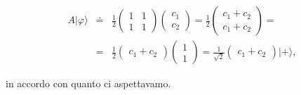 \begin{eqnarray}
A | \varphi \rangle &\doteq & \frac{1}{2}
\begin{pmatrix}
1 & 1\\
1 & 1
\end{pmatrix}
\begin{pmatrix}
c_1\\
c_2
\end{pmatrix}=
\frac{1}{2}
\begin{pmatrix}
c_1+c_2\\
c_1+c_2
\end{pmatrix}=\nonumber \\
&=& \frac{1}{2}
\begin{pmatrix}
c_1 + c_2
\end{pmatrix}
\begin{pmatrix}
1\\
1
\end{pmatrix}=
\frac{1}{\sqrt{2}}
\begin{pmatrix}
c_1 + c_2
\end{pmatrix}
| + \rangle ,
\end{eqnarray}

in accordo con quanto ci aspettavamo.